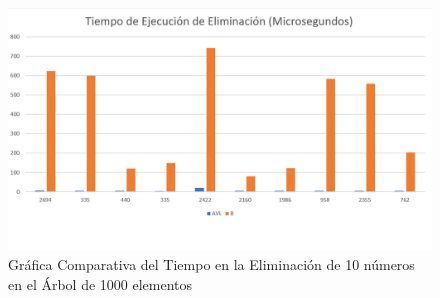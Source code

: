 \documentclass[acmsmall]{acmart}
\begin{document}
\begin{figure}[ht]
  \centering
  \caption{Gráfica Comparativa del Tiempo en la Eliminación de 10 números en el Árbol de 1000 elementos}

  \includegraphics[angle=0,scale=0.5]{1000.3 elem.png}
  
\end{figure}
\end{document}
